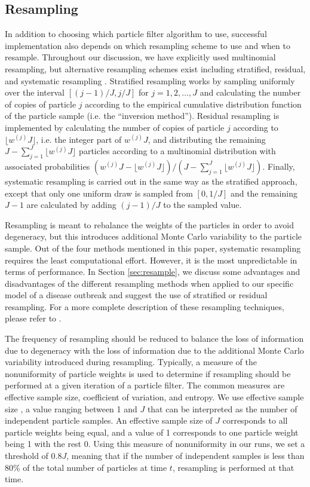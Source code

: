 \documentclass{elsarticle}
\begin{document}
\subsection{Resampling \label{sec:advice}}

In addition to choosing which particle filter algorithm to use, successful implementation also depends on which resampling scheme to use and when to resample. Throughout our discussion, we have explicitly used multinomial resampling, but alternative resampling schemes exist including stratified, residual, and systematic resampling \citep{Douc:Capp:Moul:comp:2005}. Stratified resampling works by sampling uniformly over the interval $[(j-1) / J, j / J]$ for $j = 1, 2, \ldots, J$ and calculating the number of copies of particle $j$ according to the empirical cumulative distribution function of the particle sample (i.e. the ``inversion method''). Residual resampling is implemented by calculating the number of copies of particle $j$ according to $\lfloor w^{(j)} J \rfloor$, i.e. the integer part of $w^{(j)} J$, and distributing the remaining $J - \sum^J_{j=1} \lfloor w^{(j)} J \rfloor$  particles according to a multinomial distribution with associated probabilities $(w^{(j)} J - \lfloor w^{(j)} J \rfloor) / (J - \sum^J_{j=1} \lfloor w^{(j)} J \rfloor)$. Finally, systematic resampling is carried out in the same way as the stratified approach, except that only one uniform draw is sampled from $[0, 1/J]$ and the remaining $J-1$ are calculated by adding $(j-1) / J$ to the sampled value.

Resampling is meant to rebalance the weights of the particles in order to avoid degeneracy, but this introduces additional Monte Carlo variability to the particle sample. Out of the four methods mentioned in this paper, systematic resampling requires the least computational effort. However, it is the most unpredictable in terms of performance. In Section \ref{sec:resample}, we discuss some advantages and disadvantages of the different resampling methods when applied to our specific model of a disease outbreak and suggest the use of stratified or residual resampling. For a more complete description of these resampling techniques, please refer to \citet{Douc:Capp:Moul:comp:2005}.

The frequency of resampling should be reduced to balance the loss of information due to degeneracy with the loss of information due to the additional Monte Carlo variability introduced during resampling. Typically, a measure of the nonuniformity of particle weights is used to determine if resampling should be performed at a given iteration of a particle filter. The common measures are effective sample size, coefficient of variation, and entropy. We use effective sample size \citep{Liu:Chen:Wong:reje:1998}, a value ranging between 1 and $J$ that can be interpreted as the number of independent particle samples. An effective sample size of $J$ corresponds to all particle weights being equal, and a value of 1 corresponds to one particle weight being 1 with the rest 0. Using this measure of nonuniformity in our runs, we set a threshold of $0.8J$, meaning that if the number of independent samples is less than 80\% of the total number of particles at time $t$, resampling is performed at that time.
\end{document}
